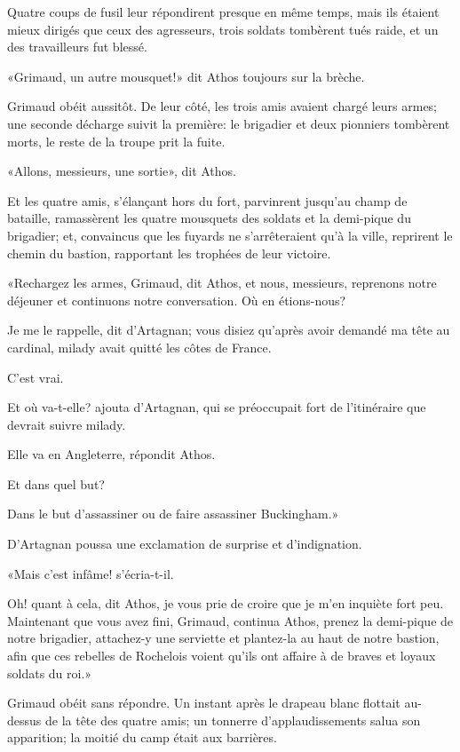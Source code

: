 Quatre coups de fusil leur répondirent presque en même temps, mais ils étaient mieux dirigés que ceux des agresseurs, trois soldats tombèrent tués raide, et un des travailleurs fut blessé. 

«Grimaud, un autre mousquet!» dit Athos toujours sur la brèche. 

Grimaud obéit aussitôt. De leur côté, les trois amis avaient chargé leurs armes; une seconde décharge suivit la première: le brigadier et deux pionniers tombèrent morts, le reste de la troupe prit la fuite. 

«Allons, messieurs, une sortie», dit Athos. 

Et les quatre amis, s'élançant hors du fort, parvinrent jusqu'au champ de bataille, ramassèrent les quatre mousquets des soldats et la demi-pique du brigadier; et, convaincus que les fuyards ne s'arrêteraient qu'à la ville, reprirent le chemin du bastion, rapportant les trophées de leur victoire. 

«Rechargez les armes, Grimaud, dit Athos, et nous, messieurs, reprenons notre déjeuner et continuons notre conversation. Où en étions-nous? 

\speak  Je me le rappelle, dit d'Artagnan; vous disiez qu'après avoir demandé ma tête au cardinal, milady avait quitté les côtes de France. 

\speak  C'est vrai. 

\speak  Et où va-t-elle? ajouta d'Artagnan, qui se préoccupait fort de l'itinéraire que devrait suivre milady. 

\speak  Elle va en Angleterre, répondit Athos. 

\speak  Et dans quel but? 

\speak  Dans le but d'assassiner ou de faire assassiner Buckingham.» 

D'Artagnan poussa une exclamation de surprise et d'indignation. 

«Mais c'est infâme! s'écria-t-il. 

\speak  Oh! quant à cela, dit Athos, je vous prie de croire que je m'en inquiète fort peu. Maintenant que vous avez fini, Grimaud, continua Athos, prenez la demi-pique de notre brigadier, attachez-y une serviette et plantez-la au haut de notre bastion, afin que ces rebelles de Rochelois voient qu'ils ont affaire à de braves et loyaux soldats du roi.» 

Grimaud obéit sans répondre. Un instant après le drapeau blanc flottait au-dessus de la tête des quatre amis; un tonnerre d'applaudissements salua son apparition; la moitié du camp était aux barrières. 

